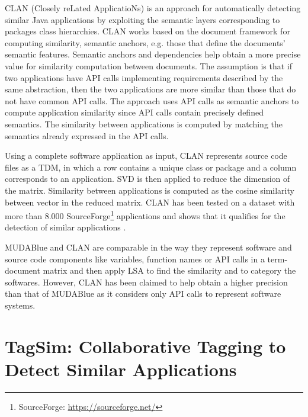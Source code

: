 CLAN (Closely reLated ApplicatioNs) \cite{McMillan:2012:DSS:2337223.2337267} is an approach for automatically detecting similar Java applications by exploiting the semantic layers corresponding to packages class hierarchies. CLAN works based on the document framework for computing similarity, semantic anchors, e.g. those that define the documents' semantic features. Semantic anchors and dependencies help obtain a more precise value for similarity computation between documents. The assumption is that if two applications have API calls implementing requirements described by the same abstraction, then the two applications are more similar than those that do not have common API calls. The approach uses API calls as semantic anchors to compute application similarity since API calls contain precisely defined semantics. The similarity between applications is computed by matching the semantics already expressed in the API calls.

Using a complete software application as input, CLAN represents source code files as a TDM, in which a row contains a unique class or package and a column corresponds to an application. SVD is then applied to reduce the dimension of the matrix. Similarity between applications is computed as the cosine similarity between vector in the reduced matrix. CLAN has been tested on a dataset with more than $8.000$ SourceForge\footnote{SourceForge: \url{https://sourceforge.net/}} applications and shows that it qualifies for the detection of similar applications \cite{McMillan:2012:DSS:2337223.2337267}.

MUDABlue and CLAN are comparable in the way they represent software and source code components like variables, function names or API calls in a term-document matrix and then apply LSA to find the similarity and to category the softwares. However, CLAN has been claimed to help obtain a higher precision than that of MUDABlue as it considers only API calls to represent software systems. 


\section{TagSim: Collaborative Tagging to Detect Similar Applications}\label{sec:tagsim}

